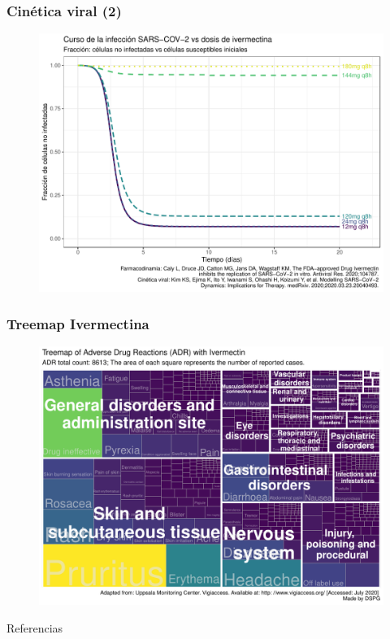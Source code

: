 \documentclass[12pt]{beamer}
\begin{document}
	\begin{frame}	
		\frametitle{Cinética viral (2)}	
		\begin{figure}
			\centering
			\includegraphics[width=0.9\linewidth]{../modelo_PD_2/figuras/G4}
			\label{fig:g1}
		\end{figure}
	\end{frame}
	
	\begin{frame}
		\frametitle[Mapa IVM]{Treemap Ivermectina}
		\begin{figure}[t]
			\centering
			\includegraphics[width=0.8\linewidth]{../seguridad_IVM/Heat_Map_IVM}
			\label{fig:heatmapivm}
		\end{figure}
	\end{frame}

	\begin{frame}{Referencias}
		
	\end{frame}
\end{document}
